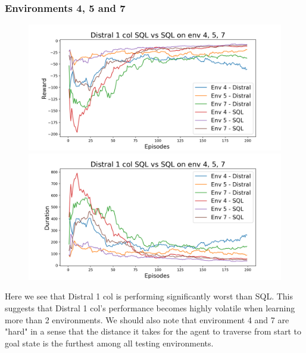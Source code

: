 \documentclass[12pt]{report}
\begin{document}
\subsubsection{Environments 4, 5 and 7}
\begin{figure}[H]
\centering
\begin{minipage}{.5\textwidth}
\centering
\includegraphics[width=\textwidth]{figs/d1_col_sql/d1_col_sql_4_5_7_rwd.png}
\end{minipage}%
\centering
\begin{minipage}{.5\textwidth}
\centering
\includegraphics[width=\textwidth]{figs/d1_col_sql/d1_col_sql_4_5_7_dur.png}
\end{minipage}%
\end{figure}
Here we see that Distral 1 col is performing significantly worst than SQL. This suggests that Distral 1 col's performance becomes highly volatile when learning more than 2 environments. We should also note that environment 4 and 7 are "hard" in a sense that the distance it takes for the agent to traverse from start to goal state is the furthest among all testing environments.
\end{document}

